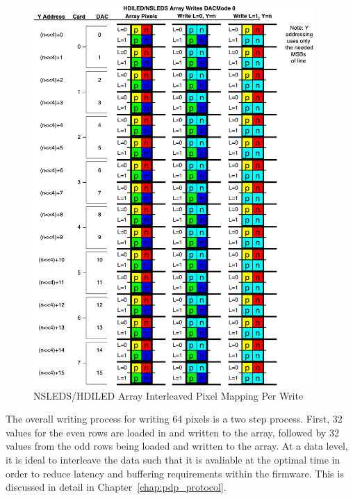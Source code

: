     \begin{figure}
        \centering
        \includegraphics[width=0.95\textwidth]{fig/nsleds_hdiled_array_writing.pdf}
        \caption{NSLEDS/HDILED Array Interleaved Pixel Mapping Per Write}
        \label{fig:nsleds_hdiled_array_interleaved_pixel_mapping_per_write}
    \end{figure}

    The overall writing process for writing 64 pixels is a two step process. First, 32 values for the even rows are loaded in and written to the array, followed by 32 values from the odd rows being loaded and written to the array. At a data level, it is ideal to interleave the data such that it is avaliable at the optimal time in order to reduce latency and buffering requirements within the firmware. This is discussed in detail in Chapter~\ref{chap:pdp_protocol}.

